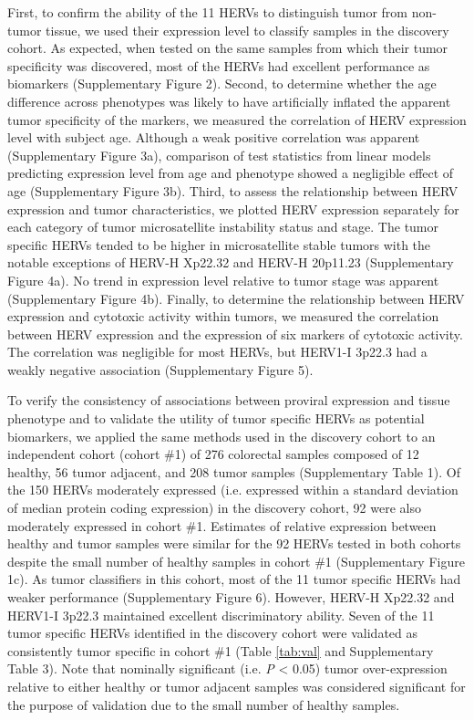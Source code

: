 First, to confirm the ability of the 11 HERVs to distinguish tumor from non-tumor tissue, we used their expression level to classify samples in the discovery cohort.
As expected, when tested on the same samples from which their tumor specificity was discovered, most of the HERVs had excellent performance as biomarkers (Supplementary Figure 2).
Second, to determine whether the age difference across phenotypes was likely to have artificially inflated the apparent tumor specificity of the markers, we measured the correlation of HERV expression level with subject age.
Although a weak positive correlation was apparent (Supplementary Figure 3a), comparison of test statistics from linear models predicting expression level from age and phenotype showed a negligible effect of age (Supplementary Figure 3b).
Third, to assess the relationship between HERV expression and tumor characteristics, we plotted HERV expression separately for each category of tumor microsatellite instability status and stage.
The tumor specific HERVs tended to be higher in microsatellite stable tumors with the notable exceptions of HERV-H Xp22.32 and HERV-H 20p11.23 (Supplementary Figure 4a).
No trend in expression level relative to tumor stage was apparent (Supplementary Figure 4b).
Finally, to determine the relationship between HERV expression and cytotoxic activity within tumors, we measured the correlation between HERV expression and the expression of six markers of cytotoxic activity.
The correlation was negligible for most HERVs, but HERV1-I 3p22.3 had a weakly negative association (Supplementary Figure 5).

To verify the consistency of associations between proviral expression and tissue phenotype and to validate the utility of tumor specific HERVs as potential biomarkers, we applied the same methods used in the discovery cohort to an independent cohort (cohort \#1) of 276 colorectal samples composed of 12 healthy, 56 tumor adjacent, and 208 tumor samples (Supplementary Table 1).
Of the 150 HERVs moderately expressed (i.e. expressed within a standard deviation of median protein coding expression) in the discovery cohort, 92 were also moderately expressed in cohort \#1.
Estimates of relative expression between healthy and tumor samples were similar for the 92 HERVs tested in both cohorts despite the small number of healthy samples in cohort \#1 (Supplementary Figure 1c).
As tumor classifiers in this cohort, most of the 11 tumor specific HERVs had weaker performance (Supplementary Figure 6).
However, HERV-H Xp22.32 and HERV1-I 3p22.3 maintained excellent discriminatory ability.
Seven of the 11 tumor specific HERVs identified in the discovery cohort were validated as consistently tumor specific in cohort \#1 (Table \ref{tab:val} and Supplementary Table 3).
Note that nominally significant (i.e. \emph{P} < 0.05) tumor over-expression relative to either healthy or tumor adjacent samples was considered significant for the purpose of validation due to the small number of healthy samples.

